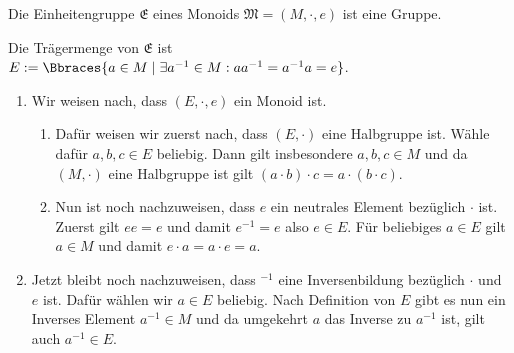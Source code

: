 \begin{exercise}
    Die Einheitengruppe $\mathfrak{E}$ eines Monoids $\mathfrak{M} = (M, \cdot, e)$ ist eine Gruppe.
\end{exercise}

\begin{solution}
    Die Trägermenge von $\mathfrak{E}$ ist $E := \Bbraces{a \in M \mid \exists a^{-1} \in M: aa^{-1} = a^{-1}a = e}$.
    \begin{enumerate}[label = \arabic*.]
        \item \label{mon} Wir weisen nach, dass $(E, \cdot, e)$ ein Monoid ist.
        \begin{enumerate}[label = \ref{mon}\arabic*.]
            \item Dafür weisen wir zuerst nach, dass $(E, \cdot)$ eine Halbgruppe ist. Wähle dafür $a, b, c \in E$ beliebig. Dann gilt insbesondere $a, b, c \in M$ und da $(M, \cdot)$ eine Halbgruppe ist gilt $(a \cdot b) \cdot c = a \cdot (b \cdot c)$. 
            \item Nun ist noch nachzuweisen, dass $e$ ein neutrales Element bezüglich $\cdot$ ist. Zuerst gilt $ee = e$ und damit $e^{-1} = e$ also $e \in E$. Für beliebiges $a \in E$ gilt $a \in M$ und damit $e \cdot a = a \cdot e = a$.
        \end{enumerate}
        \item Jetzt bleibt noch nachzuweisen, dass $^{-1}$ eine Inversenbildung bezüglich $\cdot$ und $e$ ist. Dafür wählen wir $a \in E$ beliebig. Nach Definition von $E$ gibt es nun ein Inverses Element $a^{-1} \in M$ und da umgekehrt $a$ das Inverse zu $a^{-1}$ ist, gilt auch $a^{-1} \in E$. 
    \end{enumerate}
\end{solution}